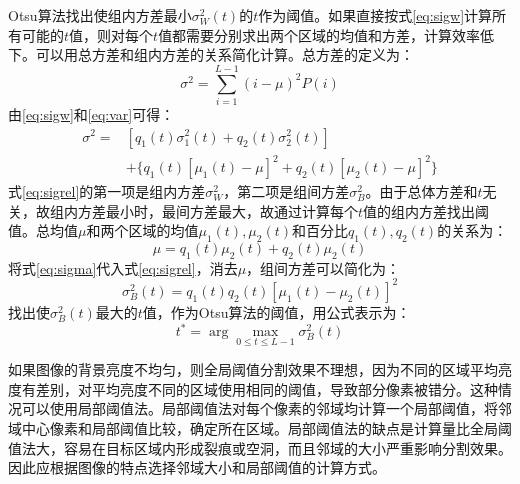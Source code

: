 Otsu算法找出使组内方差最小$\sigma_W^2(t)$的$t$作为阈值。如果直接按式\ref{eq:sigw}计算所有可能的$t$值，则对每个$t$值都需要分别求出两个区域的均值和方差，计算效率低下。可以用总方差和组内方差的关系简化计算。总方差的定义为：
\begin{equation}
  \label{eq:var}
  \sigma^2=\sum_{i=1}^{L-1}(i-\mu)^2P(i)
\end{equation}
由\eqref{eq:sigw}和\eqref{eq:var}可得：
\begin{equation}\begin{split}
  \label{eq:sigrel}
  \sigma^2 =&[q_1(t)\sigma_1^2(t)+q_2(t)\sigma_2^2(t)] \\
  &  +\{q_1(t)[\mu_1(t)-\mu]^2+q_2(t)[\mu_2(t)-\mu]^2\}
\end{split}\end{equation}
式\eqref{eq:sigrel}的第一项是组内方差$\sigma_W^2$，第二项是组间方差$\sigma_B^2$。由于总体方差和$t$无关，故组内方差最小时，最间方差最大，故通过计算每个$t$值的组内方差找出阈值。总均值$\mu$和两个区域的均值$\mu_1(t),\mu_2(t)$和百分比$q_1(t),q_2(t)$的关系为：
\begin{equation}
  \label{eq:sigma}
  \mu=q_1(t)\mu_2(t)+q_2(t)\mu_2(t)
\end{equation}
将式\eqref{eq:sigma}代入式\eqref{eq:sigrel}，消去$\mu$，组间方差可以简化为：
\begin{equation}
  \label{eq:sigb}
  \sigma_B^2(t)=q_1(t)q_2(t)[\mu_1(t)-\mu_2(t)]^2
\end{equation}
找出使$\sigma_B^2(t)$最大的$t$值，作为Otsu算法的阈值，用公式表示为：
\begin{equation}
  \label{eq:otsu}
  t^{*}=\arg\max_{0\leqslant t\leqslant L-1}\sigma_B^2(t)
\end{equation}

如果图像的背景亮度不均匀，则全局阈值分割效果不理想，因为不同的区域平均亮度有差别，对平均亮度不同的区域使用相同的阈值，导致部分像素被错分。这种情况可以使用局部阈值法。局部阈值法对每个像素的邻域均计算一个局部阈值，将邻域中心像素和局部阈值比较，确定所在区域。局部阈值法的缺点是计算量比全局阈值法大，容易在目标区域内形成裂痕或空洞，而且邻域的大小严重影响分割效果。因此应根据图像的特点选择邻域大小和局部阈值的计算方式。



